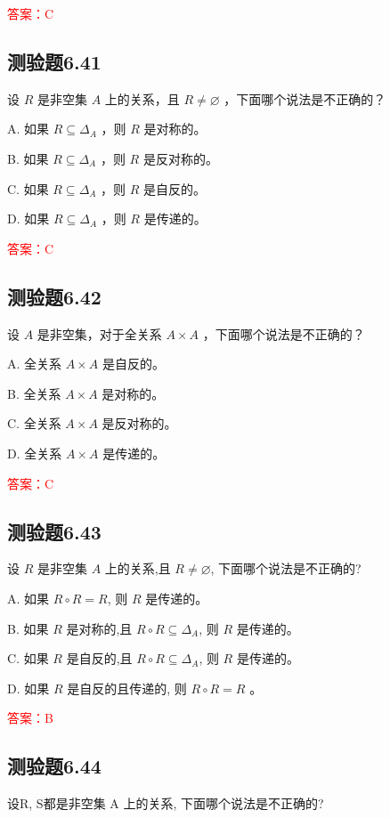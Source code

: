 \documentclass[UTF8, heading=true]{ctexart}
\begin{document}
\textcolor{red}{答案：C}

\subsection{测验题6.41}

设 $R$ 是非空集 $A$ 上的关系，且 $R \neq \varnothing$ ，下面哪个说法是不正确的？

A. 如果 $R \subseteq \Delta_A$ ，则 $R$ 是对称的。

B. 如果 $R \subseteq \Delta_A$ ，则 $R$ 是反对称的。

C. 如果 $R \subseteq \Delta_A$ ，则 $R$ 是自反的。

D. 如果 $R \subseteq \Delta_A$ ，则 $R$ 是传递的。

\textcolor{red}{答案：C}

\subsection{测验题6.42}

设 $A$ 是非空集，对于全关系 $A \times A$ ，下面哪个说法是不正确的？

A. 全关系 $A \times A$ 是自反的。

B. 全关系 $A \times A$ 是对称的。

C. 全关系 $A \times A$ 是反对称的。

D. 全关系 $A \times A$ 是传递的。

\textcolor{red}{答案：C}


\subsection{测验题6.43}

设 $R$ 是非空集 $A$ 上的关系,且 $R \neq \varnothing$, 下面哪个说法是不正确的?

A. 
如果 $R \circ R=R$, 则 $R$ 是传递的。

B. 
如果 $R$ 是对称的,且 $R \circ R \subseteq \Delta_A$, 则 $R$ 是传递的。

C. 
如果 $R$ 是自反的,且 $R \circ R \subseteq \Delta_A$, 则 $R$ 是传递的。

D. 
如果 $R$ 是自反的且传递的, 则 $R \circ R=R$ 。

\textcolor{red}{答案：B}

\subsection{测验题6.44}

设R, S都是非空集 A 上的关系, 下面哪个说法是不正确的?
\end{document}
